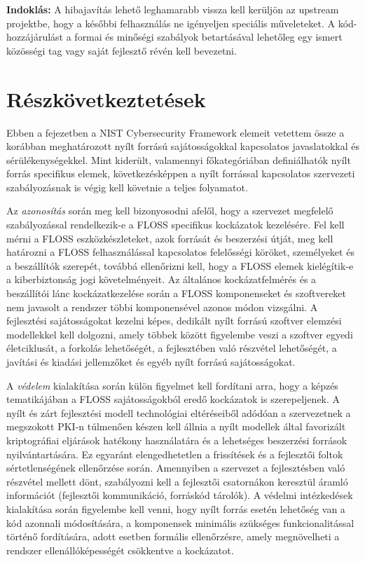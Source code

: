 \documentclass[12pt,magyar,a4paper,oneside]{scrreprt}
\begin{document}
\textbf{Indoklás: } A hibajavítás lehető leghamarabb vissza kell
kerüljön az upstream projektbe, hogy a későbbi felhasználás ne
igényeljen speciális műveleteket. A kód-hozzájárulást a formai és
minőségi szabályok betartásával lehetőleg egy ismert közösségi tag vagy
saját fejlesztő révén kell bevezetni.

\hypertarget{ruxe9szkuxf6vetkeztetuxe9sek-3}{%
\section{Részkövetkeztetések}\label{ruxe9szkuxf6vetkeztetuxe9sek-3}}

Ebben a fejezetben a NIST Cybersecurity Framework elemeit vetettem össze
a korábban meghatározott nyílt forrású sajátosságokkal kapcsolatos
javaslatokkal és sérülékenységekkel. Mint kiderült, valamennyi
főkategóriában definiálhatók nyílt forrás specifikus elemek,
következésképpen a nyílt forrással kapcsolatos szervezeti szabályozásnak
is végig kell követnie a teljes folyamatot.

Az \emph{azonosítás} során meg kell bizonyosodni afelől, hogy a
szervezet megfelelő szabályozással rendelkezik-e a FLOSS specifikus
kockázatok kezelésére. Fel kell mérni a FLOSS eszközkészleteket, azok
forrását és beszerzési útját, meg kell határozni a FLOSS felhasználással
kapcsolatos felelősségi köröket, személyeket és a beszállítók szerepét,
továbbá ellenőrizni kell, hogy a FLOSS elemek kielégítik-e a
kiberbiztonság jogi követelményeit. Az általános kockázatfelmérés és a
beszállítói lánc kockázatkezelése során a FLOSS komponenseket és
szoftvereket nem javasolt a rendszer többi komponensével azonos módon
vizsgálni. A fejlesztési sajátosságokat kezelni képes, dedikált nyílt
forrású szoftver elemzési modellekkel kell dolgozni, amely többek között
figyelembe veszi a szoftver egyedi életciklusát, a forkolás lehetőségét,
a fejlesztében való részvétel lehetőségét, a javítási és kiadási
jellemzőket és egyéb nyílt forrású sajátosságokat.

A \emph{védelem} kialakítása során külön figyelmet kell fordítani arra,
hogy a képzés tematikájában a FLOSS sajátosságokból eredő kockázatok is
szerepeljenek. A nyílt és zárt fejlesztési modell technológiai
eltéréseiből adódóan a szervezetnek a megszokott PKI-n túlmenően készen
kell állnia a nyílt modellek által favorizált kriptográfiai eljárások
hatékony használatára és a lehetséges beszerzési források
nyilvántartására. Ez egyaránt elengedhetetlen a frissítések és a
fejlesztői foltok sértetlenségének ellenőrzése során. Amennyiben a
szervezet a fejlesztésben való részvétel mellett dönt, szabályozni kell
a fejlesztői csatornákon keresztül áramló információt (fejlesztői
kommunikáció, forráskód tárolók). A védelmi intézkedések kialakítása
során figyelembe kell venni, hogy nyílt forrás esetén lehetőség van a
kód azonnali módosítására, a komponensek minimális szükséges
funkcionalitással történő fordítására, adott esetben formális
ellenőrzésre, amely megnövelheti a rendszer ellenállóképességét
csökkentve a kockázatot.
\end{document}
